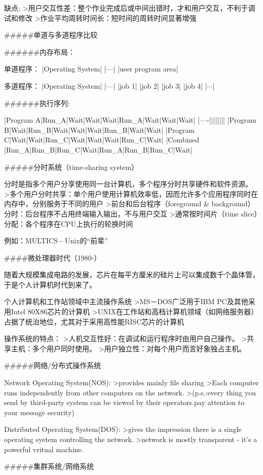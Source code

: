 缺点;
>用户交互性差：整个作业完成后或中间出错时，才和用户交互，不利于调试和修改
>作业平均周转时间长：短时间的周转时间显著增强

#####单道与多道程序比较

######内存布局：

单道程序：
|Operating System|
|---|
|user program area|

多道程序：
|Operating System|
|---|
|job 1|
|job 2|
|job 3|
|job 4|
|$\cdots$|

######执行序列:

|Program A|Run_A|Wait|Wait|Wait|Run_A|Wait|Wait|Wait|
|----||||||||
|Program B|Wait|Run_B|Wait|Wait|Wait|Run_B|Wait|Wait|
|Program C|Wait|Wait|Run_C|Wait|Wait|Wait|Run_C|Wait|
|Combined |Run_A|Run_B|Run_C|Wait|Run_A|Run_B|Run_C|Wait|


#####分时系统（time-sharing system）

分时是指多个用户分享使用同一台计算机，多个程序分时共享硬件和软件资源。
>多个用户分时共享：单个用户使用计算机效率低，因而允许多个应用程序同时在内存中，分别服务于不同的用户
>前台和后台程序（foreground & background）分时：后台程序不占用终端输入输出，不与用户交互
>通常按时间片（time slice）分配：各个程序在CPU上执行的轮换时间

例如：MULTICS - Unix的“前辈”

####微处理器时代（1980-）

随着大规模集成电路的发展，芯片在每平方厘米的硅片上可以集成数千个晶体管，于是个人计算机时代到来了。

个人计算机和工作站领域中主流操作系统
>MS－DOS广泛用于IBM PC及其他采用Intel 80X86芯片的计算机
>UNIX在工作站和高档计算机领域（如网络服务器）占据了统治地位，尤其对于采用高性能RISC芯片的计算机

操作系统的特点：
>人机交互性好：在调试和运行程序时由用户自己操作。
>共享主机：多个用户同时使用。
>用户独立性：对每个用户而言好象独占主机。

#####网络/分布式操作系统

Network Operating System(NOS):
>provides mainly file sharing
>Each computer runs independently from other computers on the network.
>(p.s.:every thing you send by third-party system can be viewed by their operators.pay attention to your message security)

Distributed Operating System(DOS):
>gives the impression there is a single operating syetem controlling the network.
>network is mostly transparent - it's a powerful vritual machine.

#####集群系统/网络系统


